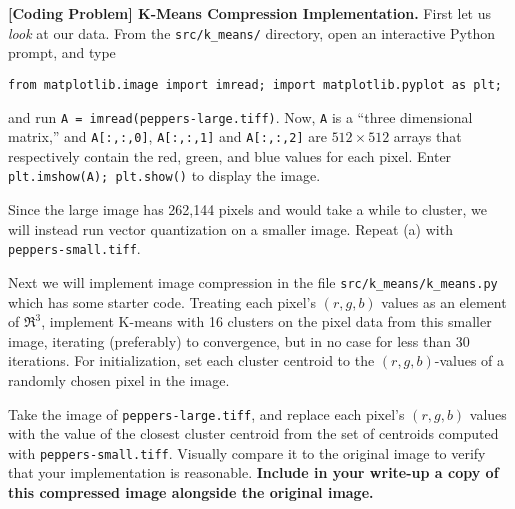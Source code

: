 \item{}
\textbf{[Coding Problem] K-Means Compression Implementation.}
First let us \emph{look} at our data. From the \texttt{src/k\_means/} directory, open an interactive Python prompt, and type
%
\begin{center}
  \texttt{from matplotlib.image import imread; import matplotlib.pyplot as plt;}
\end{center}
%
and run \texttt{A = imread(\textquotesingle{}peppers-large.tiff\textquotesingle{})}. Now, \texttt{A} is a ``three dimensional matrix,'' and \texttt{A[:,:,0]}, \texttt{A[:,:,1]} and \texttt{A[:,:,2]} are $512 \times 512$ arrays that respectively contain the red, green, and blue values for each pixel. Enter \texttt{plt.imshow(A); plt.show()} to display the image.

Since the large image has 262,144 pixels and would take a while to cluster, we will instead run vector quantization on a smaller image. Repeat (a) with \texttt{peppers-small.tiff}.


Next we will implement image compression in the file \texttt{src/k\_means/k\_means.py} which has some starter code. Treating each pixel's $(r, g, b)$ values as an element of $\Re^3$, implement K-means with 16 clusters on the pixel data from this smaller image, iterating (preferably) to convergence, but in no case for less than 30 iterations. For initialization, set each cluster centroid to the $(r, g, b)$-values of a randomly chosen pixel in the image.

Take the image of \texttt{peppers-large.tiff}, and replace each pixel's $(r, g, b)$ values with the value of the closest cluster centroid from the set of centroids computed with \texttt{peppers-small.tiff}. Visually compare it to the original image to verify that your implementation is reasonable. \textbf{Include in your write-up a copy of this compressed image alongside the original image.}
